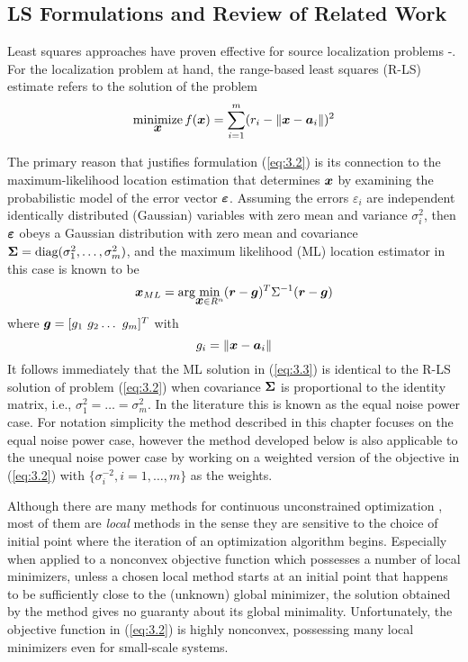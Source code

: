 \subsection{LS Formulations and Review of Related Work} %

Least squares approaches have proven effective for source localization problems \cite{SmithAbel} -\cite{BeckStLi}. For the localization problem at hand, the range-based least squares (R-LS) estimate refers to the solution of the problem
\begin{equation}\label{eq:3.2} %
\Min_{\Bx} f(\Bx)=\sum_{i=1}^{m} (r_i - \|{\Bx} - {\Ba}_i\|)^2
\end{equation}

The primary reason that justifies formulation (\ref{eq:3.2}) is its connection to the maximum-likelihood location estimation that determines $\mbox{\boldmath$x$}$ by examining the probabilistic model of the error vector $\mbox{\boldmath${\varepsilon}$}$. Assuming the errors $\varepsilon_i$ are independent identically distributed (Gaussian) variables with zero mean and variance $\sigma_i^2$, then $\mbox{\boldmath${\varepsilon}$}$ obeys a Gaussian distribution with zero mean and covariance $\mbox{\boldmath${\Sigma}$} = \mbox{diag}(\sigma_1^2, \ldots, \sigma_m^2)$, and the maximum likelihood (ML) location estimator in this case is known to be
\begin{equation} \label{eq:3.3}%
\Bx_{ML} = \mbox{arg}\!\min_{{\Bx} \in R^n} (\Br - \Bg)^T\Sigma^{-1}(\Br - \Bg)
\end{equation}
where $\mbox{\boldmath$g$} = [g_1 \ g_2 \ldots \ g_m]^T$ with
\begin{equation} \label{eq:3.4}%
g_i = \|{\Bx} - {\Ba}_i\|
\end{equation}
It follows immediately that the ML solution in (\ref{eq:3.3}) is identical to the R-LS solution of problem (\ref{eq:3.2}) when covariance $\mbox{\boldmath${\Sigma}$}$ is proportional to the identity matrix, i.e., $\sigma_1^2=\ldots =\sigma_m^2$. In the literature this is known as the equal noise power case. For notation simplicity the method described in this chapter focuses on the equal noise power case, however the method developed below is also applicable to the unequal noise power case by working on a weighted version of the objective in  (\ref{eq:3.2})  with $\{\sigma_i^{-2}, i = 1, \ldots, m\}$ as the weights.

Although there are many methods for continuous unconstrained optimization \cite{AntonLu}, most of them are \textit{local} methods in the sense they are sensitive to the choice of initial point where the iteration of an optimization algorithm begins. Especially when applied to a nonconvex objective function which possesses a number of local minimizers, unless a chosen local method starts at an initial point that happens to be sufficiently close to the (unknown) global minimizer, the solution obtained by the method gives no guaranty about its global minimality. Unfortunately, the objective function in (\ref{eq:3.2}) is highly nonconvex, possessing many local minimizers even for small-scale systems.


